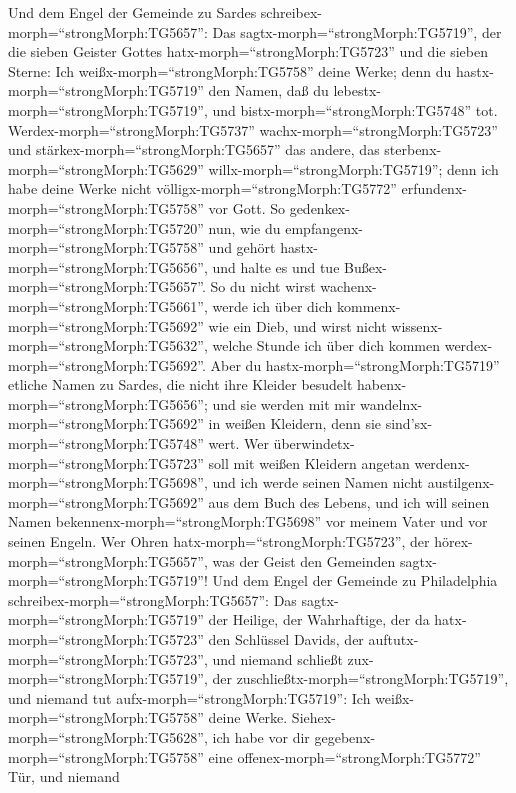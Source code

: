  Und dem Engel der Gemeinde zu Sardes
schreibex-morph=``strongMorph:TG5657'': Das
sagtx-morph=``strongMorph:TG5719'', der die sieben Geister Gottes
hatx-morph=``strongMorph:TG5723'' und die sieben Sterne: Ich
weißx-morph=``strongMorph:TG5758'' deine Werke; denn du
hastx-morph=``strongMorph:TG5719'' den Namen, daß du
lebestx-morph=``strongMorph:TG5719'', und
bistx-morph=``strongMorph:TG5748'' tot. 
Werdex-morph=``strongMorph:TG5737'' wachx-morph=``strongMorph:TG5723''
und stärkex-morph=``strongMorph:TG5657'' das andere, das
sterbenx-morph=``strongMorph:TG5629''
willx-morph=``strongMorph:TG5719''; denn ich habe deine Werke nicht
völligx-morph=``strongMorph:TG5772''
erfundenx-morph=``strongMorph:TG5758'' vor Gott.  So
gedenkex-morph=``strongMorph:TG5720'' nun, wie du
empfangenx-morph=``strongMorph:TG5758'' und gehört
hastx-morph=``strongMorph:TG5656'', und halte es und tue
Bußex-morph=``strongMorph:TG5657''. So du nicht wirst
wachenx-morph=``strongMorph:TG5661'', werde ich über dich
kommenx-morph=``strongMorph:TG5692'' wie ein Dieb, und wirst nicht
wissenx-morph=``strongMorph:TG5632'', welche Stunde ich über dich kommen
werdex-morph=``strongMorph:TG5692''.  Aber du
hastx-morph=``strongMorph:TG5719'' etliche Namen zu Sardes, die nicht
ihre Kleider besudelt habenx-morph=``strongMorph:TG5656''; und sie
werden mit mir wandelnx-morph=``strongMorph:TG5692'' in weißen Kleidern,
denn sie sind'sx-morph=``strongMorph:TG5748'' wert.  Wer
überwindetx-morph=``strongMorph:TG5723'' soll mit weißen Kleidern
angetan werdenx-morph=``strongMorph:TG5698'', und ich werde seinen Namen
nicht austilgenx-morph=``strongMorph:TG5692'' aus dem Buch des Lebens,
und ich will seinen Namen bekennenx-morph=``strongMorph:TG5698'' vor
meinem Vater und vor seinen Engeln.  Wer Ohren
hatx-morph=``strongMorph:TG5723'', der
hörex-morph=``strongMorph:TG5657'', was der Geist den Gemeinden
sagtx-morph=``strongMorph:TG5719''!  Und dem Engel der
Gemeinde zu Philadelphia schreibex-morph=``strongMorph:TG5657'': Das
sagtx-morph=``strongMorph:TG5719'' der Heilige, der Wahrhaftige, der da
hatx-morph=``strongMorph:TG5723'' den Schlüssel Davids, der
auftutx-morph=``strongMorph:TG5723'', und niemand schließt
zux-morph=``strongMorph:TG5719'', der
zuschließtx-morph=``strongMorph:TG5719'', und niemand tut
aufx-morph=``strongMorph:TG5719'':  Ich
weißx-morph=``strongMorph:TG5758'' deine Werke.
Siehex-morph=``strongMorph:TG5628'', ich habe vor dir
gegebenx-morph=``strongMorph:TG5758'' eine
offenex-morph=``strongMorph:TG5772'' Tür, und niemand
